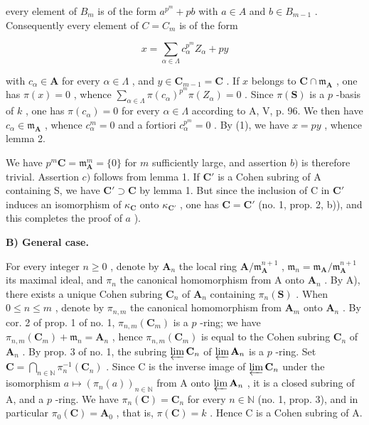 every element of \(B_{m}\) is of the form \(a^{p^{m}} + pb\) with \(a \in A\) and \(b \in B_{m-1}\) . Consequently every element of \(C = C_{m}\) is of the form

\[
x = \sum_ {\alpha \in \Lambda} c _ {\alpha} ^ {p ^ {m}} Z _ {\alpha} + p y\tag{1}
\]

with \(c_{\alpha} \in \mathbf{A}\) for every \(\alpha \in \Lambda\) , and \(y \in \mathbf{C}_{m-1} = \mathbf{C}\) . If \(x\) belongs to \(\mathbf{C} \cap \mathfrak{m}_{\mathbf{A}}\) , one has \(\pi(x) = 0\) , whence \(\sum_{\alpha \in \Lambda} \pi(c_{\alpha})^{p^m} \pi(Z_{\alpha}) = 0\) . Since \(\pi(\mathbf{S})\) is a \(p\) -basis of \(k\) , one has \(\pi(c_{\alpha}) = 0\) for every \(\alpha \in \Lambda\) according to A, V, p. 96. We then have \(c_{\alpha} \in \mathfrak{m}_{\mathbf{A}}\) , whence \(c_{\alpha}^m = 0\) and a fortiori \(c_{\alpha}^{p^m} = 0\) . By (1), we have \(x = py\) , whence lemma 2.

We have \(p^m\mathbf{C} = \mathfrak{m}_{\mathbf{A}}^m = \{0\}\) for \(m\) sufficiently large, and assertion \(b)\) is therefore trivial. Assertion \(c)\) follows from lemma 1. If \(\mathbf{C}'\) is a Cohen subring of A containing S, we have \(\mathbf{C}' \supset \mathbf{C}\) by lemma 1. But since the inclusion of C in \(\mathbf{C}'\) induces an isomorphism of \(\kappa_{\mathbf{C}}\) onto \(\kappa_{\mathbf{C}'}\) , one has \(\mathbf{C} = \mathbf{C}'\) (no. 1, prop. 2, b)), and this completes the proof of \(a\) ).

\noindent\textbf{B) General case.}\par

For every integer \(n \geqslant 0\) , denote by \(\mathbf{A}_n\) the local ring \(\mathbf{A}/\mathfrak{m}_{\mathbf{A}}^{n+1}\) , \(\mathfrak{m}_n = \mathfrak{m}_{\mathbf{A}}/\mathfrak{m}_{\mathbf{A}}^{n+1}\) its maximal ideal, and \(\pi_n\) the canonical homomorphism from A onto \(\mathbf{A}_n\) . By A), there exists a unique Cohen subring \(\mathbf{C}_n\) of \(\mathbf{A}_n\) containing \(\pi_n(\mathbf{S})\) . When \(0 \leqslant n \leqslant m\) , denote by \(\pi_{n,m}\) the canonical homomorphism from \(\mathbf{A}_m\) onto \(\mathbf{A}_n\) . By cor. 2 of prop. 1 of no. 1, \(\pi_{n,m}(\mathbf{C}_m)\) is a \(p\) -ring; we have \(\pi_{n,m}(\mathbf{C}_m) + \mathfrak{m}_n = \mathbf{A}_n\) , hence \(\pi_{n,m}(\mathbf{C}_m)\) is equal to the Cohen subring \(\mathbf{C}_n\) of \(\mathbf{A}_n\) . By prop. 3 of no. 1, the subring \(\varprojlim \mathbf{C}_n\) of \(\varprojlim \mathbf{A}_n\) is a \(p\) -ring. Set \(\mathbf{C} = \bigcap_{n \in \mathbb{N}} \pi_n^{-1}(\mathbf{C}_n)\) . Since C is the inverse image of \(\varprojlim \mathbf{C}_n\) under the isomorphism \(a \mapsto (\pi_n(a))_{n \in \mathbb{N}}\) from A onto \(\varprojlim \mathbf{A}_n\) , it is a closed subring of A, and a \(p\) -ring. We have \(\pi_n(\mathbf{C}) = \mathbf{C}_n\) for every \(n \in \mathbb{N}\) (no. 1, prop. 3), and in particular \(\pi_0(\mathbf{C}) = \mathbf{A}_0\) , that is, \(\pi(\mathbf{C}) = k\) . Hence C is a Cohen subring of A.

